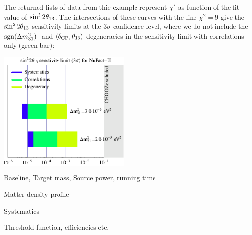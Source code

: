 {The returned lists of data from thie example represent $\chi^2$ 
as function of the fit value of $\sin^2 2 \theta_{13}$. The intersections of these
curves with the line $\chi^2 = 9$ give the $\sin^2 2 \theta_{13}$ sensitivity
limits at the $3 \sigma$ confidence level, where we do not include the
 $\mathrm{sgn}(\Delta m_{31}^2)$- and $(\delta_{\mathrm{CP}},\theta_{13})$-degeneracies in the sensitivity limit with correlations only (green bar):
\begin{center}
\colorbox{white}{\includegraphics[width=6.5cm]{barsex}}
\end{center}
}

\bi
\item
 Baseline, Target mass, Source power, running time
\item
 Matter density profile
\item
 Systematics
\item
 Threshold function, efficiencies etc.
\ei